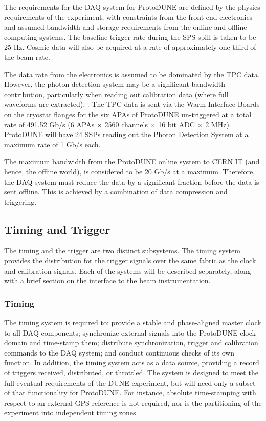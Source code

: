 The requirements for the DAQ system for ProtoDUNE are defined
by the physics requirements of the experiment, with constraints from the
front-end electronics and assumed bandwidth and storage requirements
from the online and offline computing systems.  The baseline trigger
rate during the SPS spill is taken to be 25 Hz.  Cosmic data will also
be acquired at a rate of approximately one third of the beam rate.

The data rate from the electronics is assumed to be dominated by the
TPC data.  However, the photon detection system may be a significant
bandwidth contribution, particularly when reading out calibration data
(where full waveforms are extracted).  .
The TPC data is sent via the Warm Interface Boards on the cryostat flanges
for the six APAs of ProtoDUNE un-triggered at a total rate of 491.52 Gb/s
(6 APAs $\times$ 2560 channels $\times$ 16 bit ADC $\times$ 2 MHz).
ProtoDUNE will have 24 SSPs reading out the Photon Detection System at
a maximum rate of 1 Gb/s each.

The maximum bandwidth from the ProtoDUNE online system to CERN IT (and
hence, the offline world), is considered to be 20 Gb/s at a maximum.
Therefore, the DAQ system must reduce the data by a significant fraction
before the data is sent offline.  This is achieved by a combination of
data compression and triggering.


\subsection{Timing and Trigger}
\label{sec:daq_time}

The timing and the trigger are two distinct subsystems.  The timing
system provides the distribution for the trigger signals over the same
fabric as the clock and calibration signals.  Each of the systems will
be described separately, along with a brief section on the interface to
the beam instrumentation.

\subsubsection{Timing}


The timing system is required to: provide a stable and phase-aligned
master clock to all DAQ components; synchronize external signals into the
ProtoDUNE clock domain and time-stamp them; distribute synchronization,
trigger and calibration commands to the DAQ system; and conduct continuous
checks of its own function. In addition, the timing system acts as a
data source, providing a record of triggers received, distributed, or
throttled. The system is designed to meet the full eventual requirements
of the DUNE experiment, but will need only a subset of that functionality
for ProtoDUNE. For instance, absolute time-stamping with respect to an
external GPS reference is not required, nor is the partitioning of the
experiment into independent timing zones.

